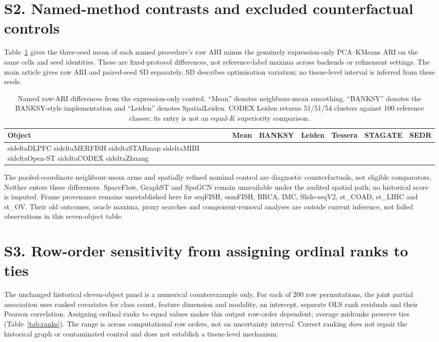 \documentclass[11pt]{article}
\begin{document}
\section*{S2. Named-method contrasts and excluded counterfactual controls}
Table~\ref{tab:contrasts} gives the three-seed mean of each named procedure's
raw ARI minus the genuinely expression-only PCA--KMeans ARI on the same
cells and seed identities. These are fixed-protocol differences, not
reference-label maxima across backends or refinement settings. The main
article gives raw ARI and paired-seed SD separately. SD describes optimisation
variation; no tissue-level interval is inferred from these seeds.

\begin{table}[H]\centering\footnotesize
\caption{Named raw-ARI differences from the expression-only control.
``Mean'' denotes neighbour-mean smoothing, ``BANKSY'' denotes the
BANKSY-style implementation and ``Leiden'' denotes SpatialLeiden.
CODEX Leiden returns 51/51/54 clusters against 100 reference classes;
its entry is not an equal-$K$ superiority comparison.}
\label{tab:contrasts}
\setlength{\tabcolsep}{4pt}
\begin{tabular}{lrrrrrr}\toprule
Object & Mean & BANKSY & Leiden & Tessera & STAGATE & SEDR\\\midrule
\csname sideltaDLPFC\endcsname
\csname sideltaMERFISH\endcsname
\csname sideltaSTARmap\endcsname
\csname sideltaMIBI\endcsname
\csname sideltaOpen-ST\endcsname
\csname sideltaCODEX\endcsname
\csname sideltaZhuang\endcsname
\bottomrule\end{tabular}
\end{table}

The pooled-coordinate neighbour-mean arms and spatially refined nominal
control are diagnostic counterfactuals, not eligible comparators. Neither
enters these differences. SpaceFlow, GraphST and SpaGCN remain unavailable
under the audited spatial path; no historical score is imputed. Frame
provenance remains unestablished here for seqFISH, osmFISH, BRCA, IMC,
Slide-seqV2, st\_COAD, st\_LIHC and st\_OV. Their old outcomes, oracle
maxima, proxy searches and component-removal analyses are outside current
inference, not failed observations in this seven-object table.

\section*{S3. Row-order sensitivity from assigning ordinal ranks to ties}
The unchanged historical eleven-object panel is a numerical counterexample
only. For each of 200 row permutations, the joint partial association uses
ranked covariates for class count, feature dimension and modality, an
intercept, separate OLS rank residuals and their Pearson correlation.
Assigning ordinal ranks to equal values makes this output row-order
dependent; average midranks preserve ties (Table~\ref{tab:ranks}). The range
is across computational row orders, not an uncertainty interval. Correct
ranking does not repair the historical graph or contaminated control and
does not establish a tissue-level mechanism.
\end{document}
